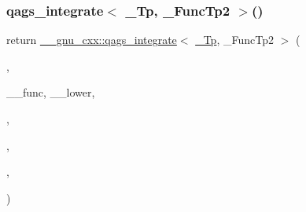 \subsubsection{\texorpdfstring{qags\+\_\+integrate$<$ \+\_\+\+Tp, \+\_\+\+Func\+Tp2 $>$()}{qags\_integrate< \_Tp, \_FuncTp2 >()}\hspace{0.1cm}{\footnotesize\ttfamily [4/4]}}
{\footnotesize\ttfamily return \hyperlink{namespace____gnu__cxx_afde6c192a4e11d49f4c9c117277980ff}{\+\_\+\+\_\+gnu\+\_\+cxx\+::qags\+\_\+integrate}$<$ \hyperlink{namespace____gnu__cxx_a3b19a9c800ca194374ef9172290f7d79}{\+\_\+\+Tp}, \+\_\+\+Func\+Tp2 $>$ (\begin{DoxyParamCaption}\item[{\+\_\+\+\_\+workspace}]{,  }\item[{\hyperlink{struct____gnu__cxx_1_1map__a__pinf}{map\+\_\+a\+\_\+pinf}$<$ \hyperlink{namespace____gnu__cxx_a3b19a9c800ca194374ef9172290f7d79}{\+\_\+\+Tp}, \+\_\+\+Func\+Tp $>$}]{\+\_\+\+\_\+func, \+\_\+\+\_\+lower,  }\item[{\hyperlink{namespace____gnu__cxx_a3b19a9c800ca194374ef9172290f7d79}{\+\_\+\+Tp}\{0\}}]{,  }\item[{\hyperlink{namespace____gnu__cxx_a3b19a9c800ca194374ef9172290f7d79}{\+\_\+\+Tp}\{1\}}]{,  }\item[{\+\_\+\+\_\+max\+\_\+abs\+\_\+err}]{,  }\item[{\+\_\+\+\_\+max\+\_\+rel\+\_\+err}]{ }\end{DoxyParamCaption})}

\mbox{\label{namespace____gnu__cxx_a2d5a79b861842d746035f4ae626e3056}} 
